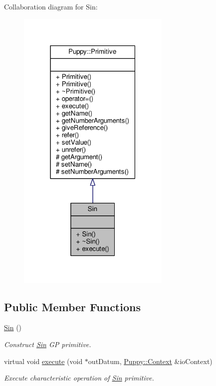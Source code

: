 Collaboration diagram for Sin\+:
\nopagebreak
\begin{figure}[H]
\begin{center}
\leavevmode
\includegraphics[width=207pt]{classSin__coll__graph}
\end{center}
\end{figure}
\subsection*{Public Member Functions}
\begin{DoxyCompactItemize}
\item 
\hypertarget{classSin_ae1f86757154337ee08d5c08033bc2b31}{}\hyperlink{classSin_ae1f86757154337ee08d5c08033bc2b31}{Sin} ()\label{classSin_ae1f86757154337ee08d5c08033bc2b31}

\begin{DoxyCompactList}\small\item\em Construct \hyperlink{classSin}{Sin} G\+P primitive. \end{DoxyCompactList}\item 
virtual void \hyperlink{classSin_a52e8e8096eb90f30418dc74e0a89a1ec}{execute} (void $\ast$out\+Datum, \hyperlink{classPuppy_1_1Context}{Puppy\+::\+Context} \&io\+Context)
\begin{DoxyCompactList}\small\item\em Execute characteristic operation of \hyperlink{classSin}{Sin} primitive. \end{DoxyCompactList}\end{DoxyCompactItemize}
